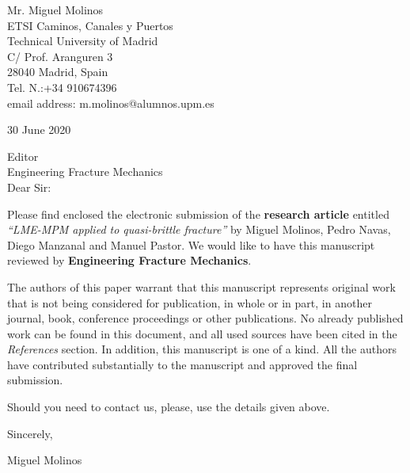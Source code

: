 \documentclass[10pt]{letter}
\begin{document}
Mr. Miguel Molinos\\
ETSI Caminos, Canales y Puertos\\
Technical University of Madrid\\
C/ Prof. Aranguren 3\\
28040 Madrid, Spain\\
Tel. N.:+34 910674396\\
email address: m.molinos@alumnos.upm.es\\

\vspace{.2in}

30 June 2020

\vspace{.3in}

Editor\\
Engineering Fracture Mechanics\\



Dear Sir:

\vspace{.2in}

Please find enclosed the electronic submission of the
\textbf{research article} entitled \textit{``LME-MPM applied to
  quasi-brittle fracture''} by Miguel Molinos, Pedro Navas, Diego
Manzanal and Manuel Pastor. We would like to have this manuscript
reviewed by \textbf{Engineering Fracture Mechanics}. 

The authors of this paper warrant that this manuscript represents
original work that is not being considered for publication, in
whole or in part, in another journal, book, conference proceedings
or other publications. No already published work can be found in
this document, and all used sources have been cited in the
\textit{References} section. In addition, this manuscript is one
of a kind. All the authors have contributed substantially to the
manuscript and approved the final submission.

Should you need to contact us, please, use the details given above.



\vspace{.1in}

Sincerely,

\vspace{.3in}

Miguel Molinos
\end{document}
